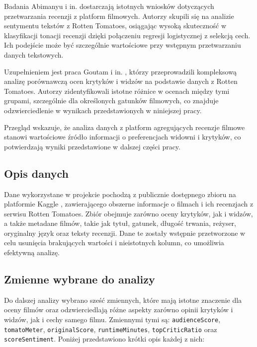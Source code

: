 \documentclass[a4paper,12pt,titlepage]{article}
\begin{document}
Badania Abimanyu i in. \cite{abimanyu2023} dostarczają istotnych wniosków dotyczących przetwarzania recenzji z platform filmowych. Autorzy skupili się na analizie sentymentu tekstów z Rotten Tomatoes, osiągając wysoką skuteczność w klasyfikacji tonacji recenzji dzięki połączeniu regresji logistycznej z selekcją cech. Ich podejście może być szczególnie wartościowe przy wstępnym przetwarzaniu danych tekstowych.

Uzupełnieniem jest praca Goutam i in. \cite{goutam2018}, którzy przeprowadzili kompleksową analizę porównawczą ocen krytyków i widzów na podstawie danych z Rotten Tomatoes. Autorzy zidentyfikowali istotne różnice w ocenach między tymi grupami, szczególnie dla określonych gatunków filmowych, co znajduje odzwierciedlenie w wynikach przedstawionych w niniejszej pracy.

Przegląd wskazuje, że analiza danych z platform agregujących recenzje filmowe stanowi wartościowe źródło informacji o preferencjach widowni i krytyków, co potwierdzają wyniki przedstawione w dalszej części pracy.

\subsection{Opis danych}

Dane wykorzystane w projekcie pochodzą z publicznie dostępnego zbioru na platformie Kaggle \cite{kaggle2025}, zawierającego obszerne informacje o filmach i ich recenzjach z serwisu Rotten Tomatoes. Zbiór obejmuje zarówno oceny krytyków, jak i widzów, a także metadane filmów, takie jak tytuł, gatunek, długość trwania, reżyser, oryginalny język oraz teksty recenzji. Dane te zostały wstępnie przetworzone w celu usunięcia brakujących wartości i nieistotnych kolumn, co umożliwia efektywną analizę.

\subsection{Zmienne wybrane do analizy}

Do dalszej analizy wybrano sześć zmiennych, które mają istotne znaczenie dla oceny filmów oraz odzwierciedlają różne aspekty zarówno opinii krytyków i widzów, jak i cechy samego filmu. Zmiennymi tymi są: \texttt{audienceScore}, \texttt{tomatoMeter}, \texttt{originalScore}, \texttt{runtimeMinutes}, \texttt{topCriticRatio} oraz \texttt{scoreSentiment}. Poniżej przedstawiono krótki opis każdej z nich:
\end{document}
